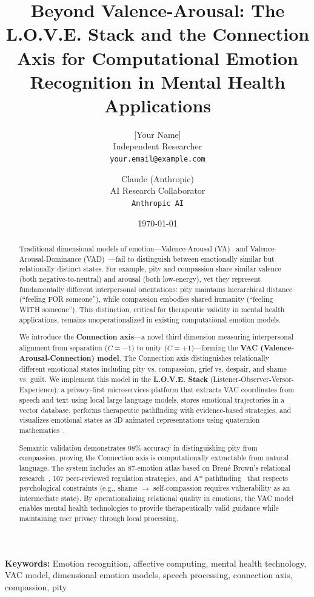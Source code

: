 \documentclass[10pt,twocolumn]{article}
\title{Beyond Valence-Arousal: The L.O.V.E. Stack and the Connection Axis for Computational Emotion Recognition in Mental Health Applications}
\author{
    [Your Name] \\
    Independent Researcher \\
    \texttt{your.email@example.com}
    \and
    Claude (Anthropic) \\
    AI Research Collaborator \\
    \texttt{Anthropic AI}
}
\date{\today}
\begin{document}
\maketitle

\begin{abstract}

\end{abstract}

\noindent
\textbf{Keywords:} Emotion recognition, affective computing, mental health technology, VAC model, dimensional emotion models, speech processing, connection axis, compassion, pity


\begin{abstract}
Traditional dimensional models of emotion—Valence-Arousal (VA)~\cite{russell1980} and Valence-Arousal-Dominance (VAD)~\cite{mehrabian1974}—fail to distinguish between emotionally similar but relationally distinct states. For example, pity and compassion share similar valence (both negative-to-neutral) and arousal (both low-energy), yet they represent fundamentally different interpersonal orientations: pity maintains hierarchical distance (``feeling FOR someone''), while compassion embodies shared humanity (``feeling WITH someone''). This distinction, critical for therapeutic validity in mental health applications, remains unoperationalized in existing computational emotion models.

We introduce the \textbf{Connection axis}—a novel third dimension measuring interpersonal alignment from separation ($C = -1$) to unity ($C = +1$)—forming the \textbf{VAC (Valence-Arousal-Connection) model}. The Connection axis distinguishes relationally different emotional states including pity vs. compassion, grief vs. despair, and shame vs. guilt. We implement this model in the \textbf{L.O.V.E. Stack} (Listener-Observer-Versor-Experience), a privacy-first microservices platform that extracts VAC coordinates from speech and text using local large language models, stores emotional trajectories in a vector database, performs therapeutic pathfinding with evidence-based strategies, and visualizes emotional states as 3D animated representations using quaternion mathematics~\cite{shoemake1985}.

Semantic validation demonstrates 98\% accuracy in distinguishing pity from compassion, proving the Connection axis is computationally extractable from natural language. The system includes an 87-emotion atlas based on Brené Brown's relational research~\cite{brown2021}, 107 peer-reviewed regulation strategies, and A* pathfinding~\cite{hart1968} that respects psychological constraints (e.g., shame $\rightarrow$ self-compassion requires vulnerability as an intermediate state). By operationalizing relational quality in emotions, the VAC model enables mental health technologies to provide therapeutically valid guidance while maintaining user privacy through local processing.
\end{abstract}
\end{document}
